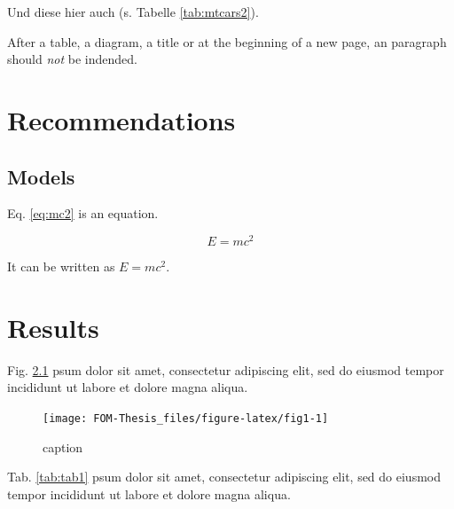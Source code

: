 \noindent Und diese hier auch (s. Tabelle \ref{tab:mtcars2}).

After a table, a diagram, a title or at the beginning of a new page, an paragraph should \emph{not} be indended.

\hypertarget{recommendations}{%
\chapter{Recommendations}\label{recommendations}}

\hypertarget{models}{%
\section{Models}\label{models}}

Eq. \eqref{eq:mc2} is an equation.

\begin{equation} 
E = mc^2
  \label{eq:mc2}
\end{equation}

It can be written as \(E = mc^2\).

\hypertarget{results}{%
\chapter{Results}\label{results}}

Fig. \ref{fig:fig1} psum dolor sit amet, consectetur adipiscing elit, sed do eiusmod tempor incididunt ut labore et dolore magna aliqua.

\begin{figure}[h]

{\centering \texttt{[image: FOM-Thesis\_files/figure-latex/fig1-1]} 

}

\caption{caption}\label{fig:fig1}
\end{figure}

Tab. \ref{tab:tab1} psum dolor sit amet, consectetur adipiscing elit, sed do eiusmod tempor incididunt ut labore et dolore magna aliqua.


